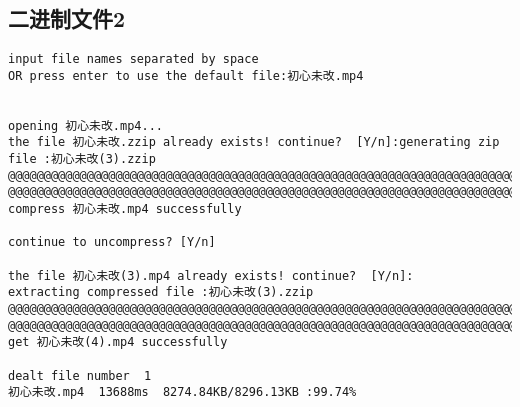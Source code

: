 \documentclass[UTF8]{ctexart}
\begin{document}
\subsection{二进制文件2}
\begin{verbatim}
input file names separated by space
OR press enter to use the default file:初心未改.mp4


opening 初心未改.mp4...
the file 初心未改.zzip already exists! continue?  [Y/n]:generating zip file :初心未改(3).zzip
@@@@@@@@@@@@@@@@@@@@@@@@@@@@@@@@@@@@@@@@@@@@@@@@@@@@@@@@@@@@@@@@@@@@@@@@@@@@@@@@
@@@@@@@@@@@@@@@@@@@@@@@@@@@@@@@@@@@@@@@@@@@@@@@@@@@@@@@@@@@@@@@@@@@@@@@@@@@@@@@@
compress 初心未改.mp4 successfully

continue to uncompress? [Y/n]

the file 初心未改(3).mp4 already exists! continue?  [Y/n]:
extracting compressed file :初心未改(3).zzip
@@@@@@@@@@@@@@@@@@@@@@@@@@@@@@@@@@@@@@@@@@@@@@@@@@@@@@@@@@@@@@@@@@@@@@@@@@@@@@@@
@@@@@@@@@@@@@@@@@@@@@@@@@@@@@@@@@@@@@@@@@@@@@@@@@@@@@@@@@@@@@@@@@@@@@@@@@@@@@@@@
get 初心未改(4).mp4 successfully

dealt file number  1
初心未改.mp4  13688ms  8274.84KB/8296.13KB :99.74%
\end{verbatim}

\clearpage
\end{document}
